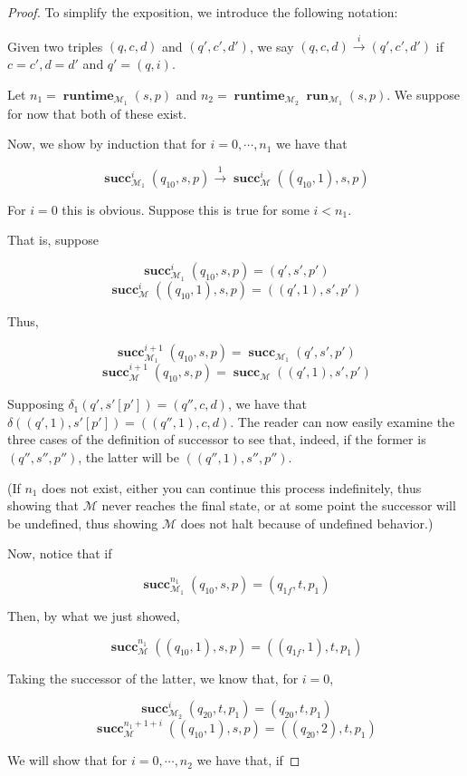 \documentclass{article}
\newcommand{\M}{\mathcal{M}}
\newcommand{\prarrow}[1]{\overset{#1}{\rightarrow}}
\DeclareMathOperator{\suc}{\mathbf{succ}}
\DeclareMathOperator{\run}{\mathbf{run}}
\DeclareMathOperator{\runtime}{\mathbf{runtime}}
\begin{document}
	\begin{proof}
	To simplify the exposition, we introduce the following notation:
	
	Given two triples $(q, c, d)$ and $(q', c', d')$, we say $(q, c, d) \prarrow{i} (q', c', d')$ if $c = c', d = d'$ and $q' = (q, i)$.
	
	Let $n_1 = \runtime_{\M_1} (s,p)$ and $n_2 = \runtime_{\M_2} \run_{\M_1} (s,p)$. We suppose for now that both of these exist.
	
	Now, we show by induction that for $i = 0, \cdots, n_1$ we have that
	
	\[\suc^{i}_{\M_1} (q_{10}, s, p) \prarrow{1} \suc^{i}_{\M} ((q_{10}, 1), s, p)\]
	
	
	For $i = 0$ this is obvious. Suppose this is true for some $i < n_1$.
	
	That is, suppose 
	
	\[\suc^{i}_{\M_1} (q_{10}, s, p) = (q', s', p')\]
	\[\suc^{i}_{\M} ((q_{10}, 1), s, p) = ((q', 1), s', p')\]
	
	Thus,
	
	\[\suc^{i+1}_{\M_1} (q_{10}, s, p) = \suc_{\M_1} (q', s', p')\]
	\[\suc^{i+1}_{\M} (q_{10}, s, p) = \suc_{\M} ((q',1), s', p')\]
	
	Supposing $\delta_1(q', s'[p']) = (q'', c, d)$, we have that $\delta((q', 1), s'[p']) = ((q'', 1), c, d)$. The reader can now easily examine the three cases of the definition of successor to see that, indeed, if the former is $(q'', s'', p'')$, the latter will be $((q'', 1), s'', p'')$.
	
	(If $n_1$ does not exist, either you can continue this process indefinitely, thus showing that $\M$ never reaches the final state, or at some point the successor will be undefined, thus showing $\M$ does not halt because of undefined behavior.)
	
	Now, notice that if
	
	\[\suc^{n_1}_{\M_1} (q_{10}, s, p) = (q_{1f}, t, p_1)\]
	
	Then, by what we just showed,
	
	\[\suc^{n_1}_{\M} ((q_{10}, 1), s, p) = ((q_{1f}, 1), t, p_1)\]
	
	Taking the successor of the latter, we know that, for $i = 0$,
	
	\[\suc^{i}_{\M_2} (q_{20}, t, p_1) = (q_{20}, t, p_1)\]
	\[\suc^{n_1+1+i}_{\M} ((q_{10}, 1), s, p) = ((q_{20}, 2), t, p_1)\]
	
	We will show that for $i = 0, \cdots, n_2$ we have that, if
	

\end{proof}
\end{document}
